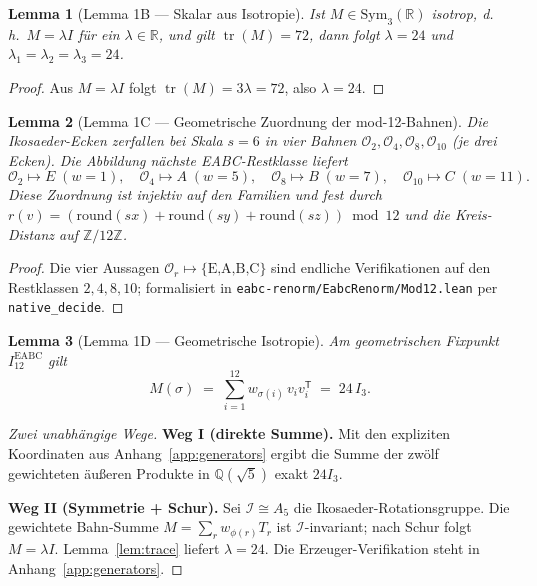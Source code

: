 \documentclass[11pt,a4paper]{article}
\newtheorem{lemma}{Lemma}
\newcommand{\R}{\mathbb{R}}
\newcommand{\Q}{\mathbb{Q}}
\newcommand{\Z}{\mathbb{Z}}
\begin{document}
	\begin{lemma}[Lemma 1B — Skalar aus Isotropie]
		\label{lem:scalar}
		Ist $M\in\mathrm{Sym}_3(\R)$ isotrop, d.\,h.\ $M=\lambda I$ für ein $\lambda\in\R$,
		und gilt $\operatorname{tr}(M)=72$, dann folgt $\lambda=24$ und
		$\lambda_1=\lambda_2=\lambda_3=24$.
	\end{lemma}
	
	\begin{proof}
		Aus $M=\lambda I$ folgt $\operatorname{tr}(M)=3\lambda=72$, also $\lambda=24$.
	\end{proof}
	
	\begin{lemma}[Lemma 1C — Geometrische Zuordnung der mod-12-Bahnen]
		\label{lem:orbit-assignment}
		Die Ikosaeder-Ecken zerfallen bei Skala $s=6$ in vier Bahnen
		$\mathcal{O}_2,\mathcal{O}_4,\mathcal{O}_8,\mathcal{O}_{10}$
		(je drei Ecken).
		Die Abbildung \emph{nächste EABC-Restklasse} liefert
		\[
		\mathcal{O}_2\mapsto E\;(w=1),\quad
		\mathcal{O}_4\mapsto A\;(w=5),\quad
		\mathcal{O}_8\mapsto B\;(w=7),\quad
		\mathcal{O}_{10}\mapsto C\;(w=11).
		\]
		Diese Zuordnung ist injektiv auf den Familien und fest durch
		$r(v)=(\mathrm{round}(sx)+\mathrm{round}(sy)+\mathrm{round}(sz))\bmod 12$
		und die Kreis-Distanz auf $\Z/12\Z$.
	\end{lemma}
	
	\begin{proof}
		Die vier Aussagen $\mathcal{O}_r\mapsto\{\text{E,A,B,C}\}$ sind endliche
		Verifikationen auf den Restklassen $2,4,8,10$; formalisiert in
		\texttt{eabc-renorm/EabcRenorm/Mod12.lean} per \texttt{native\_decide}.
	\end{proof}
	
	\begin{lemma}[Lemma 1D — Geometrische Isotropie]
		\label{lem:geom-iso}
		Am geometrischen Fixpunkt $I_{12}^{\mathrm{EABC}}$ gilt
		\[
		M(\sigma)
		\;=\;
		\sum_{i=1}^{12} w_{\sigma(i)}\, v_i v_i^{\mathsf T}
		\;=\;
		24\,I_3.
		\]
	\end{lemma}
	
	\begin{proof}[Zwei unabhängige Wege]
		\textbf{Weg I (direkte Summe).}
		Mit den expliziten Koordinaten aus Anhang~\ref{app:generators} ergibt die
		Summe der zwölf gewichteten äußeren Produkte in $\Q(\sqrt5)$ exakt $24I_3$.
		
		\smallskip\noindent
		\textbf{Weg II (Symmetrie + Schur).}
		Sei $\mathcal{I}\cong A_5$ die Ikosaeder-Rotationsgruppe.
		Die gewichtete Bahn-Summe $M=\sum_r w_{\phi(r)}T_r$ ist $\mathcal{I}$-invariant;
		nach Schur folgt $M=\lambda I$.
		Lemma~\ref{lem:trace} liefert $\lambda=24$.
		Die Erzeuger-Verifikation steht in Anhang~\ref{app:generators}.
	\end{proof}
	
\end{document}
